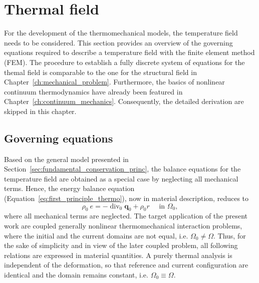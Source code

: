 \chapter{Thermal field} \label{ch:thermal_problem}

For the development of the thermomechanical models, the temperature field needs to be considered.
This section provides an overview of the governing equations required to describe a temperature field with the finite element method (FEM).
The procedure to establish a fully discrete system of equations for the themal field is comparable to the one for the structural field in Chapter~\ref{ch:mechanical_problem}.
Furthermore, the basics of nonlinear continuum thermodynamics have already been featured in Chapter~\ref{ch:continuum_mechanics}.
Consequently, the detailed derivation are skipped in this chapter.


\section{Governing equations}

Based on the general model presented in Section~\ref{sec:fundamental_conservation_princ}, the balance equations for the temperature field are obtained as a special case by neglecting all mechanical terms.
Hence, the energy balance equation (Equation~\eqref{eq:first_principle_thermo}), now in material description, reduces to
\begin{equation} \label{eq:strong_energy_eq}
\rho_0\ e=-\operatorname{div}_0 \bm q_0+\rho_0 r \quad \text { in } \Omega_0,
\end{equation}
where all mechanical terms are neglected.
The target application of the present work are coupled generally nonlinear thermomechanical interaction problems, where the initial and the current domains are not equal, i.e. \(\Omega_{0} \neq \Omega\).
Thus, for the sake of simplicity and in view of the later coupled problem, all following relations are expressed in material quantities.
A purely thermal analysis is independent of the deformation, so that reference and current configuration are identical and the domain remains constant, i.e. \(\Omega_{0} \equiv \Omega\).

